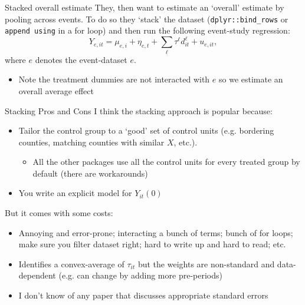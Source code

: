 \documentclass[t]{beamer}
\begin{document}

\begin{frame}{Stacked overall estimate}
  They, then want to estimate an `overall' estimate by pooling across events. To do so they `stack' the dataset (\texttt{dplyr::bind\_rows} or \texttt{append using} in a for loop) and then run the following event-study regression:
  $$
    Y_{e,it} = \mu_{e,i} + \eta_{e,t} + \sum_{\ell} \tau^\ell d_{it}^\ell + u_{e,it},
  $$
  where $e$ denotes the event-dataset $e$. 
  \begin{itemize}
    \item Note the treatment dummies are not interacted with $e$ so we estimate an overall average effect
  \end{itemize}
\end{frame}

\begin{frame}{Stacking Pros and Cons}
  I think the stacking approach is popular because: 
  \begin{itemize}
    \item Tailor the control group to a `good' set of control units (e.g. bordering counties, matching counties with similar $X$, etc.). 
    \begin{itemize}
      \item All the other packages use all the control units for every treated group by default (there are workarounds)
    \end{itemize}
    
    \item You write an explicit model for $Y_{it}(0)$
  \end{itemize}

  \bigskip
  But it comes with some costs:
  \begin{itemize}
    \item Annoying and error-prone; interacting a bunch of terms; bunch of for loops; make sure you filter dataset right; hard to write up and hard to read; etc.
    \item Identifies a convex-average of $\tau_{it}$ but the weights are non-standard and data-dependent (e.g. can change by adding more pre-periods)
    \item I don't know of any paper that discusses appropriate standard errors
  \end{itemize}
\end{frame}
\end{document}
